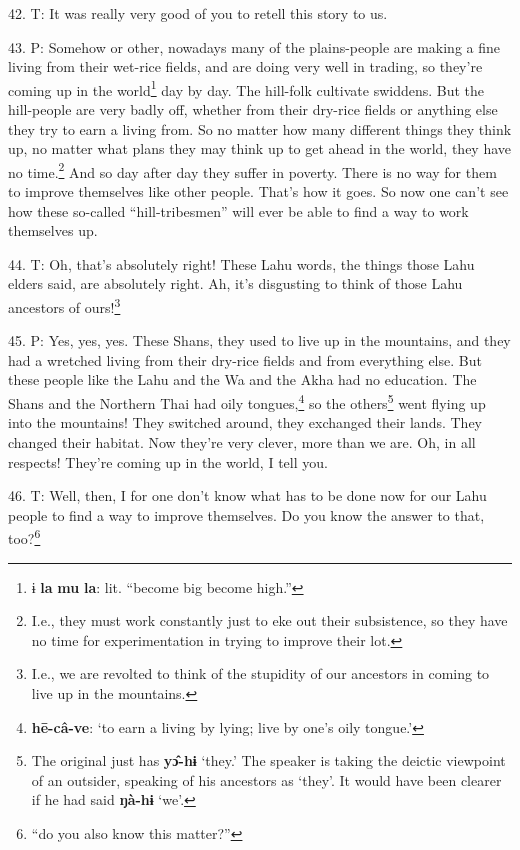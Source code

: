 42. T: It was really very good of you to retell this story to us.

43. P: Somehow or other, nowadays many of the plains-people are making a fine living
from their wet-rice fields, and are doing very well in trading, so they're coming
up in the world\footnote{ɨ \textbf{la} \textbf{mu} \textbf{la}: lit. ``become big become high.''} day by day. The hill-folk cultivate swiddens. But the hill-people
are very badly off, whether from their dry-rice fields or anything else they try
to earn a living from. So no matter how many different things they think up, no
matter what plans they may think up to get ahead in the world, they have no time.\footnote{I.e., they must work constantly just to eke out their subsistence, so they have no time for experimentation in trying to improve their lot.}
And so day after day they suffer in poverty. There is no way for them to improve
themselves like other people. That's how it goes. So now one can't see how these
so-called ``hill-tribesmen'' will ever be able to find a way to
work themselves up.

44. T: Oh, that's absolutely right! These Lahu words, the things those Lahu elders
said, are absolutely right. Ah, it's disgusting to think of those Lahu ancestors
of ours!\footnote{I.e., we are revolted to think of the stupidity of our ancestors in coming to live up in the mountains.}

45. P: Yes, yes, yes. These Shans, they used to live up in the mountains, and they
had a wretched living from their dry-rice fields and from everything else. But
these people like the Lahu and the Wa and the Akha had no education. The Shans
and the Northern Thai had oily tongues,\footnote{\textbf{hē-câ-ve}: `to earn a living by lying; live by one's oily tongue.'} so the others\footnote{The original just has \textbf{yɔ̂-hɨ} `they.' The speaker is taking the deictic viewpoint of an outsider, speaking of his ancestors as `they'. It would have been clearer if he had said \textbf{ŋà-hɨ} `we'.} went flying up into
the mountains! They switched around, they exchanged their lands. They changed their
habitat. Now they're very clever, more than we are. Oh, in all respects! They're
coming up in the world, I tell you.

46. T: Well, then, I for one don't know what has to be done now for our Lahu people
to find a way to improve themselves. Do you know the answer to that, too?\footnote{``do you also know this matter?''}

